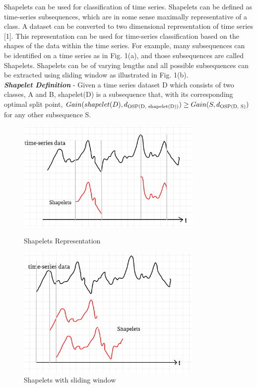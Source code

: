 \documentclass[letterpaper, 10 pt, conference]{IEEEtran}  %
\begin{document}
Shapelets can be used for classification of time series. Shapelets can be defined as time-series subsequences, which are in some sense maximally representative of a class. A dataset can be converted to two dimensional representation of time series [1]. This representation can be used for time-series classification based on the shapes of the data within the time series. For example, many subsequences can be identified on a time series as in Fig. 1(a), and those subsequences are called Shapelets. Shapelets can be of varying lengths and all possible subsequences can be extracted using sliding window as illustrated in Fig. 1(b).
\medskip\\
\textbf{\textit{Shapelet Definition}} - Given a time series dataset D which consists of two classes, A and B, shapelet(D) is a subsequence that, with its corresponding optimal split point, \(Gain(shapelet(D), d\textsubscript{OSP(D, shapelet(D))}) \geq Gain(S, d\textsubscript{OSP(D, S)})\) for any other subsequence S.
\begin{figure}
\centering
\begin{minipage}{9cm}
\parbox{9cm}{
\includegraphics[width=9cm]{shapelet1.png}
\caption{Shapelets Representation}
\label{fig:2figsA}}
\qquad
\parbox{9cm}{
\includegraphics[width=9cm]{shapelet2.png}
\caption{Shapelets with sliding window}
\label{fig:2figsB}}
\end{minipage}
\end{figure}
\end{document}
